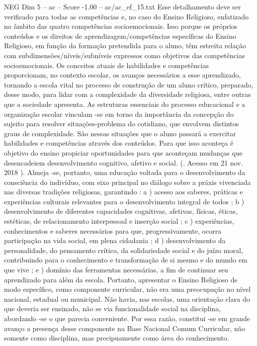 \begin{textsample}{NEG Dim 5 – ac – Score -1.00 – ac/ac\_ef\_15.txt}
Esse detalhamento deve ser verificado para todas as competências e, no caso do Ensino Religioso, enfatizado no âmbito das quatro competências socioemocionais.
Isso porque os próprios conteúdos e os direitos de aprendizagem/competências específicas do Ensino Religioso, em função da formação pretendida para o aluno, têm estreita relação com subdimensões/níveis/subníveis expressos como objetivos das competências socioemocionais.
Os conceitos atuais de habilidades e competências proporcionam, no contexto escolar, os avanços necessários a esse aprendizado, tornando a escola vital no processo de construção de um aluno crítico, preparado, desse modo, para lidar com a complexidade da diversidade religiosa, entre outras que a sociedade apresenta.
As estruturas essenciais do processo educacional e a organização escolar vinculam -se em torno da importância da concepção do sujeito para resolver situações-problema do cotidiano, que envolvem distintos graus de complexidade.
São nessas situações que o aluno passará a exercitar habilidades e competências através dos conteúdos.
Para que isso aconteça é objetivo do ensino propiciar oportunidades para que aconteçam mudanças que desencadeiem desenvolvimento cognitivo, afetivo e social. (.
Acesso em 21 nov. 2018 ).
Almeja -se, portanto, uma educação voltada para o desenvolvimento da consciência do indivíduo, com eixo principal no diálogo sobre a práxis vivenciada nas diversas tradições religiosas, garantindo : a ) acesso aos saberes, práticas e experiências culturais relevantes para o desenvolvimento integral de todos ; b ) desenvolvimento de diferentes capacidades cognitivas, afetivas, físicas, éticas, estéticas, de relacionamento interpessoal e inserção social ; c ) experiências, conhecimentos e saberes necessários para que, progressivamente, ocorra participação na vida social, em plena cidadania ; d ) desenvolvimento da personalidade, do pensamento crítico, da solidariedade social e do juízo moral, contribuindo para o conhecimento e transformação de si mesmo e do mundo em que vive ; e ) domínio das ferramentas necessárias, a fim de continuar seu aprendizado para além da escola.
Portanto, apresentar o Ensino Religioso de modo específico, como componente curricular, não era uma preocupação no nível nacional, estadual ou municipal.
Não havia, nas escolas, uma orientação clara do que deveria ser ensinado, não se via funcionalidade social na disciplina, abordando -se o que parecia conveniente.
Por essa razão, constitui -se em grande avanço a presença desse componente na Base Nacional Comum Curricular, não somente como disciplina, mas precipuamente como área do conhecimento.

\end{textsample}
